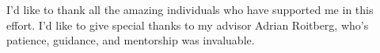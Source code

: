 I'd like to thank all the amazing individuals who have supported me in this effort.
I'd like to give special thanks to my advisor Adrian Roitberg, who's patience, guidance, and mentorship was invaluable.
